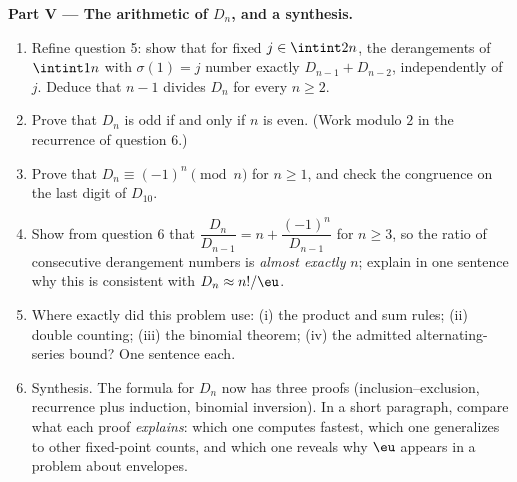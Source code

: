 \begin{problem}
\medskip
\noindent\textbf{Part V --- The arithmetic of $D_n$, and a
synthesis.}
\begin{enumerate}[resume]
  \item Refine question 5: show that for fixed $j \in
        \intint2n$, the derangements of $\intint1n$ with
        $\sigma(1) = j$ number exactly $D_{n-1} + D_{n-2}$,
        independently of $j$. Deduce that $n - 1$ divides $D_n$
        for every $n \geq 2$.
  \item Prove that $D_n$ is odd if and only if $n$ is even. (Work
        modulo $2$ in the recurrence of question 6.)
  \item Prove that $D_n \equiv (-1)^n \pmod n$ for $n \geq 1$, and
        check the congruence on the last digit of $D_{10}$.
  \item Show from question 6 that $\dfrac{D_n}{D_{n-1}} = n +
        \dfrac{(-1)^n}{D_{n-1}}$ for $n \geq 3$, so the ratio of
        consecutive derangement numbers is \emph{almost exactly}
        $n$; explain in one sentence why this is consistent with
        $D_n \approx n!/\eu$.
  \item Where exactly did this problem use: (i) the product and
        sum rules; (ii) double counting; (iii) the binomial
        theorem; (iv) the admitted alternating-series bound? One
        sentence each.
  \item Synthesis. The formula for $D_n$ now has three proofs
        (inclusion--exclusion, recurrence plus induction, binomial
        inversion). In a short paragraph, compare what each proof
        \emph{explains}: which one computes fastest, which one
        generalizes to other fixed-point counts, and which one
        reveals why $\eu$ appears in a problem about envelopes.
\end{enumerate}
\end{problem}
